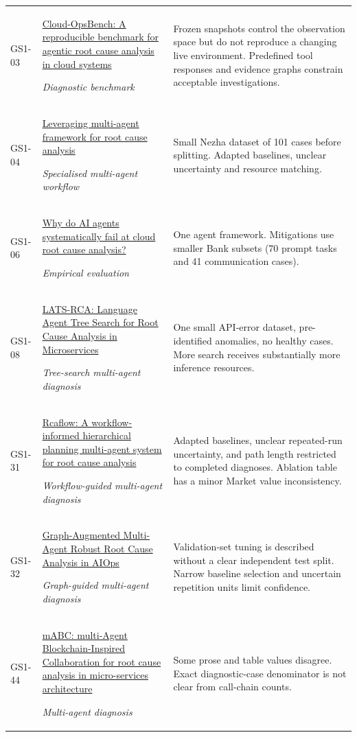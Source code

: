 \begin{longtable}{@{}p{}p{}p{}@{}}
GS1-03 & \href{https://arxiv.org/pdf/2603.00468}{Cloud-OpsBench: A reproducible benchmark for agentic root cause analysis in cloud systems}\par\emph{Diagnostic benchmark} & Frozen snapshots control the observation space but do not reproduce a changing live environment. Predefined tool responses and evidence graphs constrain acceptable investigations. \\
GS1-04 & \href{https://link.springer.com/content/pdf/10.1007/s40747-025-02096-0.pdf?error=cookies_not_supported\&code=1ef4fe7b-5190-45d9-80b8-240de4d8c9c0}{Leveraging multi-agent framework for root cause analysis}\par\emph{Specialised multi-agent workflow} & Small Nezha dataset of 101 cases before splitting. Adapted baselines, unclear uncertainty and resource matching. \\
GS1-06 & \href{https://arxiv.org/pdf/2602.09937}{Why do AI agents systematically fail at cloud root cause analysis?}\par\emph{Empirical evaluation} & One agent framework. Mitigations use smaller Bank subsets (70 prompt tasks and 41 communication cases). \\
GS1-08 & \href{https://arxiv.org/pdf/2605.03505}{LATS-RCA: Language Agent Tree Search for Root Cause Analysis in Microservices}\par\emph{Tree-search multi-agent diagnosis} & One small API-error dataset, pre-identified anomalies, no healthy cases. More search receives substantially more inference resources. \\
GS1-31 & \href{https://ojs.aaai.org/index.php/AAAI/article/view/36991/40953}{Rcaflow: A workflow-informed hierarchical planning multi-agent system for root cause analysis}\par\emph{Workflow-guided multi-agent diagnosis} & Adapted baselines, unclear repeated-run uncertainty, and path length restricted to completed diagnoses. Ablation table has a minor Market value inconsistency. \\
GS1-32 & \href{https://www.techscience.com/cmc/v88n1/67280/html}{Graph-Augmented Multi-Agent Robust Root Cause Analysis in AIOps}\par\emph{Graph-guided multi-agent diagnosis} & Validation-set tuning is described without a clear independent test split. Narrow baseline selection and uncertain repetition units limit confidence. \\
GS1-44 & \href{https://aclanthology.org/2024.findings-emnlp.232.pdf}{mABC: multi-Agent Blockchain-Inspired Collaboration for root cause analysis in micro-services architecture}\par\emph{Multi-agent diagnosis} & Some prose and table values disagree. Exact diagnostic-case denominator is not clear from call-chain counts. \\

\end{longtable}
